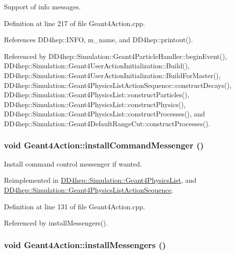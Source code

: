 Support of info messages. 

Definition at line 217 of file Geant4Action.cpp.

References DD4hep::INFO, m\_\-name, and DD4hep::printout().

Referenced by DD4hep::Simulation::Geant4ParticleHandler::beginEvent(), DD4hep::Simulation::Geant4UserActionInitialization::Build(), DD4hep::Simulation::Geant4UserActionInitialization::BuildForMaster(), DD4hep::Simulation::Geant4PhysicsListActionSequence::constructDecays(), DD4hep::Simulation::Geant4PhysicsList::constructParticles(), DD4hep::Simulation::Geant4PhysicsList::constructPhysics(), DD4hep::Simulation::Geant4PhysicsList::constructProcesses(), and DD4hep::Simulation::Geant4DefaultRangeCut::constructProcesses().\hypertarget{class_d_d4hep_1_1_simulation_1_1_geant4_action_aaaa0718b7d4f52e4c31e982b91c0eeda}{
\subsubsection[{installCommandMessenger}]{\setlength{\rightskip}{0pt plus 5cm}void Geant4Action::installCommandMessenger ()}}
\label{class_d_d4hep_1_1_simulation_1_1_geant4_action_aaaa0718b7d4f52e4c31e982b91c0eeda}


Install command control messenger if wanted. 

Reimplemented in \hyperlink{class_d_d4hep_1_1_simulation_1_1_geant4_physics_list_af18b7d6454f56d0aa6e55a2046cff019}{DD4hep::Simulation::Geant4PhysicsList}, and \hyperlink{class_d_d4hep_1_1_simulation_1_1_geant4_physics_list_action_sequence_a9c60c66de8a46726b0b3d781042c22a6}{DD4hep::Simulation::Geant4PhysicsListActionSequence}.

Definition at line 131 of file Geant4Action.cpp.

Referenced by installMessengers().\hypertarget{class_d_d4hep_1_1_simulation_1_1_geant4_action_a82c72e9476d6a5541252edbb93fe69c6}{
\subsubsection[{installMessengers}]{\setlength{\rightskip}{0pt plus 5cm}void Geant4Action::installMessengers ()}}
\label{class_d_d4hep_1_1_simulation_1_1_geant4_action_a82c72e9476d6a5541252edbb93fe69c6}


